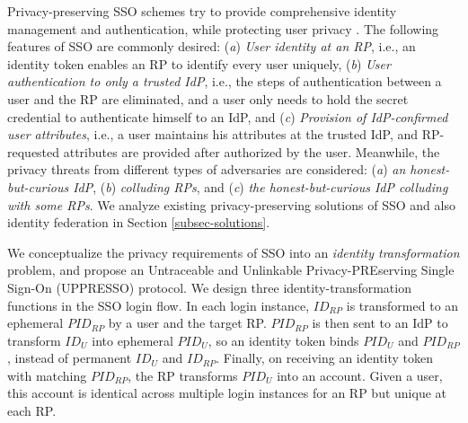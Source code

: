 Privacy-preserving SSO schemes try to provide comprehensive identity management and authentication,
    while protecting user privacy \cite{maler2008venn,NIST2017draft,BrowserID,SPRESSO}.
The following features of SSO are commonly desired:
(\emph{a}) \emph{User identity at an RP},
    i.e., an identity token enables an RP to identify every user uniquely,
(\emph{b}) \emph{User authentication to only a trusted IdP}, i.e.,
    the steps of authentication between a user and the RP are eliminated,
    and a user only needs to hold the secret credential to authenticate himself to an IdP,
and (\emph{c}) \emph{Provision of IdP-confirmed user attributes},
    i.e., a user maintains his attributes at the trusted IdP,
    and RP-requested attributes are provided %
            after authorized by the user.
Meanwhile,
    the privacy threats from different types of adversaries are considered:
    (\emph{a}) \emph{an honest-but-curious IdP},
    (\emph{b}) \emph{colluding RPs},
    and (\emph{c}) \emph{the honest-but-curious IdP colluding with some RPs}.
We analyze existing privacy-preserving solutions of SSO and also identity federation
in Section \ref{subsec-solutions}.



We conceptualize the privacy requirements of SSO into
  an {\em identity transformation} problem, %
and propose an Untraceable and Unlinkable Privacy-PREserving Single Sign-On (UPPRESSO) protocol.
We design three identity-transformation functions in the SSO login flow.
In each login instance,
        $ID_{RP}$ is transformed to an ephemeral $PID_{RP}$  by a user and the target RP.
$PID_{RP}$ is then sent to an IdP to transform $ID_U$ into ephemeral $PID_U$,
    so an identity token binds $PID_U$ and $PID_{RP}$, instead of permanent $ID_U$ and $ID_{RP}$.
Finally,
    on receiving an identity token with matching $PID_{RP}$,
        the RP transforms $PID_U$ into an account.
Given a user, this account is identical across multiple login instances for an RP
     but unique at each RP.

